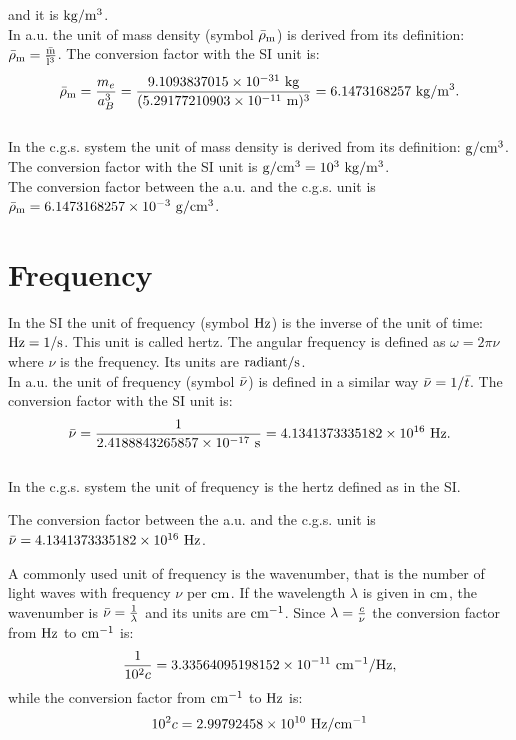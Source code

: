 \documentclass[12pt,a4paper,twoside]{report}
\def\me{9.1093837015\times 10^{-31}}
\def\abohr{5.29177210903\times 10^{-11}}
\def\barrhom{6.1473168257}
\def\bart{2.4188843265857\times 10^{-17}}
\def\barnu{4.1341373335182\times 10^{16}}
\def\barrhomcgs{6.1473168257\times 10^{-3}}
\def\hzcmm1{3.33564095198152\times 10^{-11}}
\def\cmm1hz{2.99792458\times 10^{10}}
\begin{document}
and it is ${\rm kg}/{\rm m}^3$.
\\

{\color{web-blue} In a.u. the unit of mass density 
(symbol ${\rm \bar \rho_m}$) is derived from
its definition: ${\rm \bar \rho_m}= {{\rm \bar m} \over {\rm \bar l}^3}$.
The conversion factor with the SI unit is:
\begin{equation}
{\rm \bar \rho_m} = {m_e \over a_B^3}= {\me\ {\rm kg} \over (\abohr\ {\rm m})^3}=
\barrhom\ {\rm kg}/{\rm m}^3.
\end{equation}
}
\\

{\color{orange} In the c.g.s. system the unit of mass density is derived from
its definition: ${{\rm g}/{\rm cm}^3}$. The conversion factor with
the SI unit is ${{\rm g}/{\rm cm}^3}=10^3\ {\rm kg}/{\rm m}^3$.
}
\\

{\color{green} The conversion factor between the a.u. and the c.g.s. unit is
${\rm \bar \rho_m}=\barrhomcgs\ {\rm g}/{\rm cm}^3$.
}

\newpage
{\color{coral}\section{Frequency}}
\color{black}

In the SI the unit of frequency (symbol ${\rm Hz}$) is the inverse
of the unit of time: ${\rm Hz}=1/{\rm s}$. This unit is called hertz.
The angular frequency is defined as $\omega = 2 \pi \nu$ where 
$\nu$ is the frequency. Its units are ${\rm radiant}/{\rm s}$.
\\

{\color{web-blue} In a.u. the unit of frequency (symbol ${\rm \bar \nu}$) is defined
in a similar way ${\rm \bar \nu}= 1/\bar t$. The conversion factor with the 
SI unit is:
\begin{equation}
{\rm \bar \nu} = {1 \over \bart\ {\rm s}}=\barnu\ {\rm Hz}.
\end{equation}
}
\\

{\color{orange} In the c.g.s. system the unit of frequency is the hertz 
defined as in the SI.
\\
}

{\color{green} The conversion factor between the a.u. and the c.g.s. unit is
${\rm \bar \nu}=\barnu\ {\rm Hz}$.
\\
}

{\color{red}
A commonly used unit of frequency is the wavenumber, that is the number of 
light waves with frequency $\nu$ per ${\rm cm}$. If the wavelength $\lambda$ is
given in ${\rm cm}$, the wavenumber is $\bar \nu={1\over \lambda}$ and its units
are ${\rm cm}^{-1}$. Since $\lambda={c\over \nu}$ the conversion factor
from ${\rm Hz}$ to ${\rm cm}^{-1}$ is:
\begin{equation}
{1\over 10^2 c}=\hzcmm1\ {\rm cm}^{-1}/{\rm Hz},
\end{equation}
while the conversion factor from ${\rm cm}^{-1}$ to ${\rm Hz}$ is:
\begin{equation}
10^2 c=\cmm1hz\ {\rm Hz}/{\rm cm}^{-1}
\end{equation}
}
\end{document}
